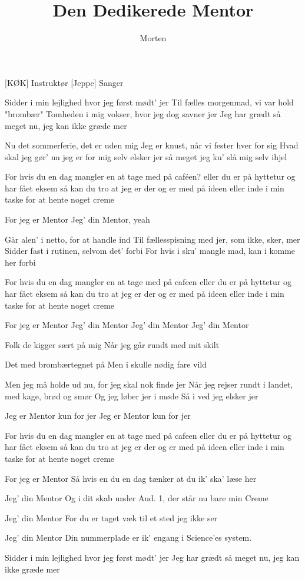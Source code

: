 \documentclass[a4paper,11pt]{article}
\title{Den Dedikerede Mentor}
\author{Morten}
\begin{document}
\maketitle

\begin{roles}
[KØK] Instruktør
[Jeppe] Sanger
\end{roles}

\begin{song}


 Sidder i min lejlighed hvor jeg først mødt' jer
Til fælles morgenmad, vi var hold "brombær"
Tomheden i mig vokser, hvor jeg dog savner jer
Jeg har grædt så meget nu, jeg kan ikke græde mer 

Nu det sommerferie, det er uden mig
Jeg er knust, når vi fester hver for sig
Hvad skal jeg gør' nu jeg er for mig selv
elsker jer så meget jeg ku' slå mig selv ihjel

For hvis du en dag mangler en at tage med på caféen?
eller du er på hyttetur og har fået eksem
så kan du tro at jeg er der og er med på ideen
eller inde i min taske for at hente noget creme 

For jeg er Mentor
Jeg' din Mentor, yeah 

Går alen' i netto, for at handle ind
Til fællesspisning med jer, som ikke, sker, mer
Sidder fast i rutinen, selvom det' forbi
For hvis i sku' mangle mad, kan i komme her forbi 

For hvis du en dag mangler en at tage med på cafeen
eller du er på hyttetur og har fået eksem
så kan du tro at jeg er der og er med på ideen
eller inde i min taske for at hente noget creme 

For jeg er Mentor
Jeg' din Mentor
Jeg' din Mentor
Jeg' din Mentor

 
Folk de kigger sært på mig
Når jeg går rundt med mit skilt   

Det med brombærtegnet på
Men i skulle nødig fare vild 

Men jeg må holde ud nu, for jeg skal nok finde jer
Når jeg rejser rundt i landet, med kage, brød og smør
Og jeg løber jer i møde
Så i ved jeg elsker jer 

Jeg er Mentor kun for jer
Jeg er Mentor kun for jer

For hvis du en dag mangler en at tage med på cafeen
eller du er på hyttetur og har fået eksem
så kan du tro at jeg er der og er med på ideen
eller inde i min taske for at hente noget creme

For jeg er Mentor
 Så hvis en du en dag tænker at du ik’ ska’ læse her

 Jeg' din Mentor
  Og i dit skab under Aud. 1, der står nu bare min Creme

 Jeg' din Mentor
 For du er taget væk til et sted jeg ikke ser

 Jeg' din Mentor
 Din nummerplade er ik’ engang i Science’es system.

 Sidder i min lejlighed hvor jeg først mødt' jer
Jeg har grædt så meget nu, jeg kan ikke græde mer
\end{song}
\end{document}
